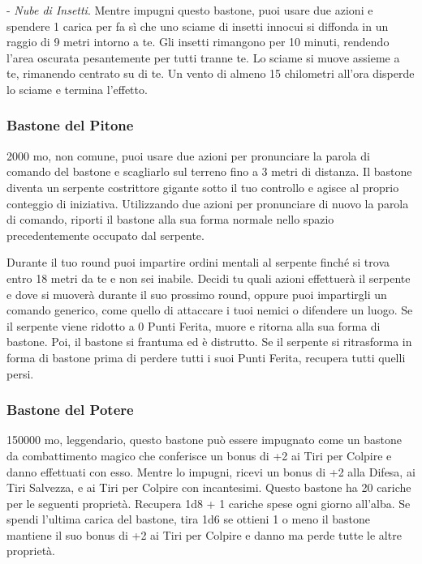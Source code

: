 \begin{multicols}{2}
	- \textit{Nube di Insetti}. Mentre impugni questo bastone, puoi usare due azioni e spendere 1 carica per fa sì che uno sciame di insetti innocui si diffonda in un raggio di 9 metri intorno a te. Gli insetti rimangono per 10 minuti, rendendo l'area oscurata pesantemente per tutti tranne te. Lo sciame si muove assieme a te, rimanendo centrato su di te. Un vento di almeno 15 chilometri all'ora disperde lo sciame e termina l'effetto.

	\subsubsection*{Bastone del Pitone}
	2000 mo, non comune, puoi usare due azioni per pronunciare la parola di comando del bastone e scagliarlo sul terreno fino a 3 metri di distanza. Il bastone diventa un serpente costrittore gigante sotto il tuo controllo e agisce al proprio conteggio di iniziativa. Utilizzando due azioni per pronunciare di nuovo la parola di comando, riporti il bastone alla sua forma normale nello spazio precedentemente occupato dal serpente.

	Durante il tuo round puoi impartire ordini mentali al serpente finché si trova entro 18 metri da te e non sei inabile. Decidi tu quali azioni effettuerà il serpente e dove si muoverà durante il suo prossimo round, oppure puoi impartirgli un comando generico, come quello di attaccare i tuoi nemici o difendere un luogo. Se il serpente viene ridotto a 0 Punti Ferita, muore e ritorna alla sua forma di bastone. Poi, il bastone si frantuma ed è distrutto. Se il serpente si ritrasforma in forma di bastone prima di perdere tutti i suoi Punti Ferita, recupera tutti quelli persi.

	\subsubsection*{Bastone del Potere}
	150000 mo, leggendario, questo bastone può essere impugnato come un bastone da combattimento magico che conferisce un bonus di +2 ai Tiri per Colpire e danno effettuati con esso. Mentre lo impugni, ricevi un bonus di +2 alla Difesa, ai Tiri Salvezza, e ai Tiri per Colpire con incantesimi. Questo bastone ha 20 cariche per le seguenti proprietà. Recupera 1d8 + 1 cariche spese ogni giorno all'alba. Se spendi l'ultima carica del bastone, tira 1d6 se ottieni 1 o meno il bastone mantiene il suo bonus di +2 ai Tiri per Colpire e danno ma perde tutte le altre proprietà.


\end{multicols}
